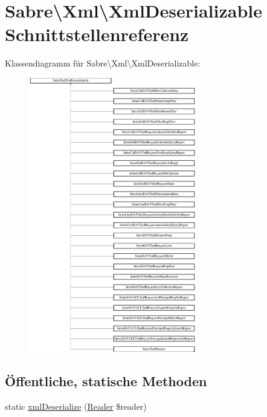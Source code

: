 \hypertarget{interface_sabre_1_1_xml_1_1_xml_deserializable}{}\section{Sabre\textbackslash{}Xml\textbackslash{}Xml\+Deserializable Schnittstellenreferenz}
\label{interface_sabre_1_1_xml_1_1_xml_deserializable}
Klassendiagramm für Sabre\textbackslash{}Xml\textbackslash{}Xml\+Deserializable\+:\begin{figure}[H]
\begin{center}
\leavevmode
\includegraphics[height=12.000000cm]{interface_sabre_1_1_xml_1_1_xml_deserializable}
\end{center}
\end{figure}
\subsection*{Öffentliche, statische Methoden}
\begin{DoxyCompactItemize}
\item 
static \mbox{\hyperlink{interface_sabre_1_1_xml_1_1_xml_deserializable_a19e0eca545b9a0d93f7d6b69085ade30}{xml\+Deserialize}} (\mbox{\hyperlink{class_sabre_1_1_xml_1_1_reader}{Reader}} \$reader)
\end{DoxyCompactItemize}


